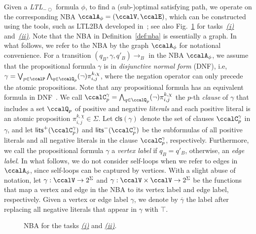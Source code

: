 \documentclass[Afour,sageh,times]{sagej}
\newcommand{\ltl}{ {\it LTL}$_{-\bigcirc}$ }
\newcommand{\autop}{\ccalA_{\phi}}
\renewcommand{\ap}[3]{\mathcal{\pi}_{{#1},{#2}}^{#3}}
\begin{document}
Given a \ltl formula $\phi$, to find a (sub-)optimal satisfying path, we operate on the corresponding NBA $\autop = (\ccalV, \ccalE)$, which can  be constructed using the tools, such as LTL2BA developed in~\cite{gastin2001fast}; see also Fig.~\ref{fig:nba_iii} for tasks~\hyperref[task:i]{\it (i)} and~\hyperref[task:ii]{\it (ii)}. Note that the NBA in Definition~\ref{def:nba} is essentially a graph. In what follows, we refer to the NBA by the graph $\autop$ for notational convenience. For a transition $(q_B, \gamma, q'_B)\to_B$ in the NBA $\autop$, we assume that the propositional formula $\gamma$ is  in {\it disjunctive normal form} (DNF), i.e,
 $ \gamma = \bigvee_{p\in \ccalP} \bigwedge_{q\in \ccalQ_p} (\neg)\ap{i}{j}{k,\chi}$, where the negation operator can only precede the atomic propositions. Note that any propositional formula has an equivalent formula in DNF~\cite{baier2008principles}. We call  $\ccalC_p^{\gamma}=\bigwedge_{q\in \ccalQ_p}(\neg) \ap{i}{j}{k,\chi}$ the $p$-th {\it clause} of $\gamma$ that includes a set $\ccalQ_p$ of positive and negative {\it literals} and each positive literal is an atomic proposition $\ap{i}{j}{k,\chi}\in \Sigma$. Let $\mathsf{cls}(\gamma)$ denote the set of clauses $\ccalC_p^{\gamma}$ in $\gamma$, and let $\mathsf{lits}^+(\ccalC_p^{\gamma})$ and $\mathsf{lits}^-(\ccalC_p^{\gamma})$ be the subformulas of all positive literals and all negative literals in the clause $\ccalC_p^\gamma$,  respectively.  Furthermore, we call the propositional formula $\gamma$ a {\it vertex label} if $q_B=q'_B$, otherwise, an {\it edge label}. In what follows, we do not consider self-loops when we refer to edges in $\autop$, since self-loops can be captured by vertices.   With a slight abuse of notation, let {$\gamma: \ccalV \to  2^\Sigma $} and {$\gamma: \ccalV \times \ccalV \to 2^\Sigma$} be the functions that map a vertex and edge in the NBA to its vertex label and edge label, respectively.  Given a vertex or edge label $\gamma$, we denote by $\overline{\gamma}$ the label after replacing all negative literals that appear in $\gamma$ with $\top$.

 \begin{figure}[!t]
   \centering
   \caption{NBA for the tasks \hyperref[task:i]{\it (i)} and \hyperref[task:ii]{\it (ii)}.}
   \label{fig:nba_iii}
 \end{figure}
\end{document}
